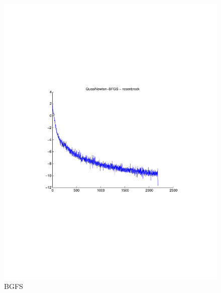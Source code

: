 \documentclass[12pt]{amsart}
\begin{document}
\begin{figure}[thpb]
\centering
\includegraphics[scale=0.80,clip=true,viewport=1in 3in 8in 8in]{images/rosenbrock-20/BFGS.pdf}
\caption{BGFS}
\label{fig:BGFS-rosen}
\end{figure}
\end{document}
